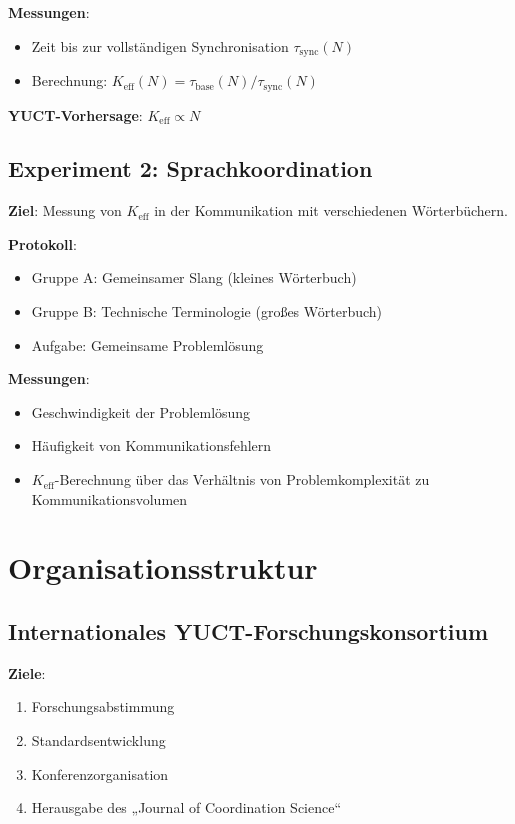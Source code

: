 \documentclass[12pt,a4paper]{article}
\begin{document}
	\textbf{Messungen}:
	\begin{itemize}
		\item Zeit bis zur vollständigen Synchronisation $\tau_{\mathrm{sync}}(N)$
		\item Berechnung: $K_{\mathrm{eff}}(N) = \tau_{\mathrm{base}}(N)/\tau_{\mathrm{sync}}(N)$
	\end{itemize}
	
	\textbf{YUCT-Vorhersage}: $K_{\mathrm{eff}} \propto N$
	
	\subsection{Experiment 2: Sprachkoordination}
	
	\textbf{Ziel}: Messung von $K_{\mathrm{eff}}$ in der Kommunikation mit verschiedenen Wörterbüchern.
	
	\textbf{Protokoll}:
	\begin{itemize}
		\item Gruppe A: Gemeinsamer Slang (kleines Wörterbuch)
		\item Gruppe B: Technische Terminologie (großes Wörterbuch)
		\item Aufgabe: Gemeinsame Problemlösung
	\end{itemize}
	
	\textbf{Messungen}:
	\begin{itemize}
		\item Geschwindigkeit der Problemlösung
		\item Häufigkeit von Kommunikationsfehlern
		\item $K_{\mathrm{eff}}$-Berechnung über das Verhältnis von Problemkomplexität zu Kommunikationsvolumen
	\end{itemize}
	
	\section{Organisationsstruktur}
	
	\subsection{Internationales YUCT-Forschungskonsortium}
	
	\textbf{Ziele}:
	\begin{enumerate}
		\item Forschungsabstimmung
		\item Standardsentwicklung
		\item Konferenzorganisation
		\item Herausgabe des „Journal of Coordination Science“
	\end{enumerate}
	
\end{document}
